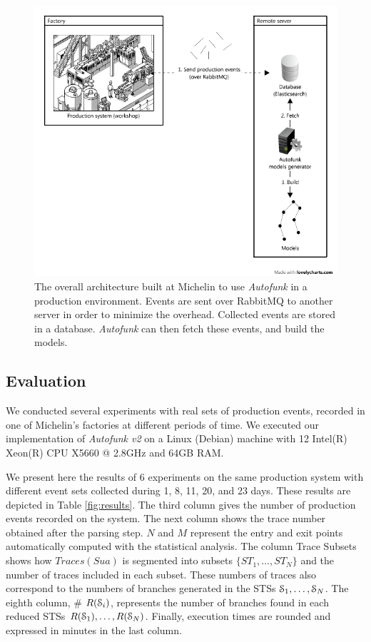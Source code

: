 \begin{figure}[ht]
    \includegraphics[width=1.0\linewidth]{figures/model-gen-branded.png}

    \caption{The overall architecture built at Michelin to use
    \textit{Autofunk} in a production environment. Events are
    sent over RabbitMQ to another server in order to minimize
    the overhead. Collected events are stored in a database.
    \textit{Autofunk} can then fetch these events, and build
    the models.}
    \label{fig:autofunk_gen_branded}
\end{figure}

\subsection{Evaluation}

We conducted several experiments with real sets of production
events, recorded in one of Michelin's factories at different
periods of time. We executed our implementation of \emph{Autofunk
v2} on a Linux (Debian) machine with 12 Intel(R) Xeon(R) CPU
X5660 @ 2.8GHz and 64GB RAM.

We present here the results of 6 experiments on the same
production system with different event sets collected during 1,
8, 11, 20, and 23 days. These results are depicted in Table
\ref{fig:results}. The third column gives the number of
production events recorded on the system. The next column shows
the trace number obtained after the parsing step.  $N$ and $M$
represent the entry and exit points automatically computed with
the statistical analysis. The column Trace Subsets shows how
$Traces(Sua)$ is segmented into subsets $\{ST_1,\dots,ST_N\}$ and
the number of traces included in each subset. These numbers of
traces also correspond to the numbers of branches generated in
the STSs $\EuScript{S}_1,\dots,\EuScript{S}_N$. The eighth column,
\# $R(\EuScript{S}_i)$, represents the number of branches found
in each reduced STSs $R(\EuScript{S}_1),\dots,R(\EuScript{S}_N)$.
Finally, execution times are rounded and expressed in minutes in
the last column.

